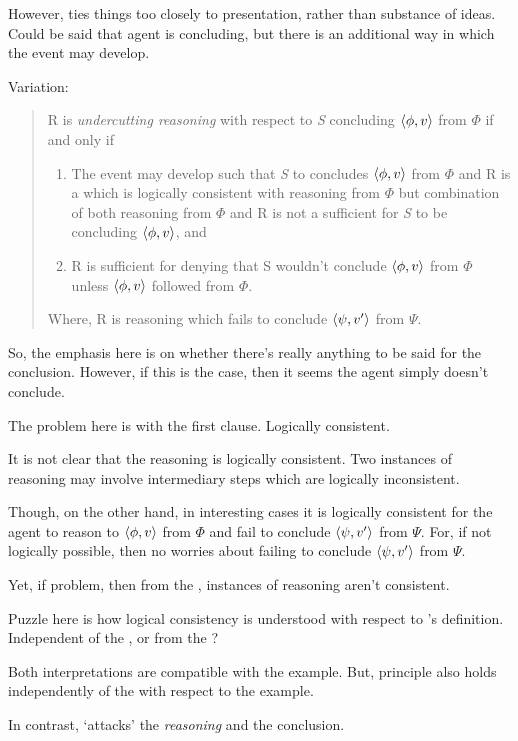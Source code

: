 \begin{note}
  However, ties things too closely to presentation, rather than substance of ideas.
  Could be said that agent is concluding, but there is an additional way in which the event may develop.

  Variation:
  \begin{quote}
    R is \emph{undercutting reasoning} with respect to \emph{S} concluding \(\langle \phi, v \rangle\) from \(\Phi\) if and only if
    \begin{enumerate}[label=(UR\arabic*), ref=(UR\arabic*)]
    \item
      The event may develop such that \emph{S} to concludes \(\langle \phi, v \rangle\) from \(\Phi\) and R is a \pevent{} which is logically consistent with reasoning from \(\Phi\) but combination of both reasoning from \(\Phi\) and R is not a sufficient for \emph{S} to be concluding \(\langle \phi, v \rangle\), and
    \item
      R is sufficient for denying that S wouldn't conclude \(\langle \phi, v \rangle\) from \(\Phi\) unless \(\langle \phi, v \rangle\) followed from \(\Phi\).%
    \end{enumerate}
    Where, R is reasoning which fails to conclude \(\langle \psi, v' \rangle\) from \(\Psi\).
  \end{quote}

  {
    \color{red}
    So, the emphasis here is on whether there's really anything to be said for the conclusion.
    However, if this is the case, then it seems the agent simply doesn't conclude.
  }

  The problem here is with the first clause.
  Logically consistent.

  It is not clear that the reasoning is logically consistent.
  Two instances of reasoning may involve intermediary steps which are logically inconsistent.

  Though, on the other hand, in interesting cases it is logically consistent for the agent to reason to \(\langle \phi, v \rangle\) from \(\Phi\) and fail to conclude \(\langle \psi, v' \rangle\) from \(\Psi\).
  For, if not logically possible, then no worries about failing to conclude \(\langle \psi, v' \rangle\) from \(\Psi\).

  Yet, if problem, then from the \agpe{}, instances of reasoning aren't consistent.

  Puzzle here is how logical consistency is understood with respect to \citeauthor{Pollock:1987un}'s definition.
  Independent of the \agpe{}, or from the \agpe{}?

  Both interpretations are compatible with the example.
  But, principle also holds independently of the \agpe{} with respect to the example.
\end{note}

\begin{note}
  In contrast, \curb{} `attacks' the \emph{reasoning} and the conclusion.
\end{note}

